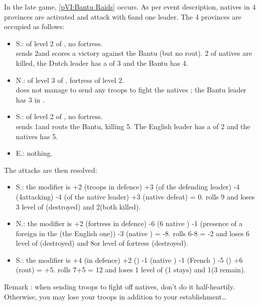 \begin{exemple}
  In the late game, \ref{pVI:Bantu Raids} occurs. As per event description,
  natives in 4 provinces are activated and attack with 6\LD and one
  leader. The 4 provinces are occupied as follows:
  \begin{itemize}
  \item \granderegionNyasa S.: \TP of level 2 of \HOL, no fortress.\\
    \HOL sends 2\LD and scores a victory against the Bantu (but no rout). 2\LD
    of natives are killed, the Dutch leader has a \Man of 3 and
    the Bantu has 4.
  \item \granderegionNatal N.: \TP of level 3 of \FRA, fortress of level 2.\\
    \FRA does not manage to send any troops to fight the natives ; the Bantu
    leader has 3 in \Man.
  \item \granderegionNatal S.: \TP of level 2 of \ANG, no fortress.\\
    \ANG sends 1\ARMY\Faceplus and routs the Bantu, killing 5\LD. The English
    leader has a \Man of 2 and the natives has 5.
  \item \granderegionCap E.: nothing.
  \end{itemize}
  The attacks are then resolved:
  \begin{itemize}
  \item \granderegionNyasa S.: the modifier is +2 (troops in defence) +3
    (\Man of the defending leader) -4 (4\LD attacking) -4
    (\Man of the native leader) +3 (native defeat) = 0. \HOL
    rolls 9 and loses 3 level of \TP (destroyed) and 2\LD (both killed).
  \item \granderegionNatal N.: the modifier is +2 (fortress in defence) -6 (6
    native \LD) -1 (presence of a foreign \TP in the \Area (the English one))
    -3 (native \Man) = -8. \FRA rolls 6-8 = -2 and loses 6 level
    of \TP (destroyed) and 8\LD or level of fortress (destroyed).
  \item \granderegionNatal S.: the modifier is +4 (\LD in defence) +2
    (\Man) -1 (native \LD) -1 (French \TP) -5 (\Man)
    +6 (rout) = +5. \ANG rolls 7+5 = 12 and loses 1 level of \TP (1 stays) and
    1\LD (3 remain).
  \end{itemize}
  Remark : when sending troops to fight off natives, don't do it
  half-heartily. Otherwise, you may lose your troops in addition to your
  establishment\ldots
\end{exemple}

